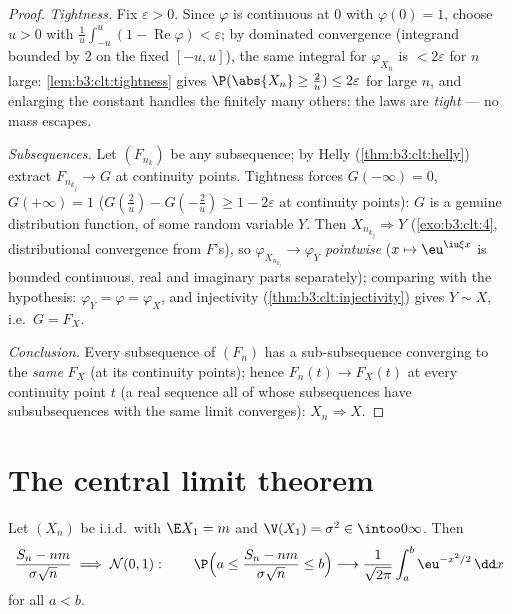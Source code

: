 \begin{proof}
\emph{Tightness.} Fix $\varepsilon > 0$. Since $\varphi$ is
continuous at $0$ with $\varphi(0) = 1$, choose $u > 0$ with
$\frac1u\int_{-u}^u(1 - \operatorname{Re}\varphi) <
\varepsilon$; by dominated convergence (integrand bounded by
$2$ on the fixed $[-u,u]$), the same integral for
$\varphi_{X_n}$ is $< 2\varepsilon$ for $n$ large:
\cref{lem:b3:clt:tightness} gives $\P(\abs{X_n} \geq \frac2u)
\leq 2\varepsilon$ for large $n$, and enlarging the constant
handles the finitely many others: the laws are \emph{tight}
--- no mass escapes.

\emph{Subsequences.} Let $(F_{n_k})$ be any subsequence; by
Helly (\cref{thm:b3:clt:helly}) extract $F_{n_{k_j}} \to G$
at continuity points. Tightness forces $G(-\infty) = 0$,
$G(+\infty) = 1$ ($G(\frac2u) - G(-\frac2u) \geq 1 -
2\varepsilon$ at continuity points): $G$ is a genuine
distribution function, of some random variable $Y$. Then
$X_{n_{k_j}} \Rightarrow Y$ (\cref{exo:b3:clt:4},
distributional convergence from $F$'s), so
$\varphi_{X_{n_{k_j}}} \to \varphi_Y$ \emph{pointwise} ($x
\mapsto \eu^{\iu\xi x}$ is bounded continuous, real and
imaginary parts separately); comparing with the hypothesis:
$\varphi_Y = \varphi = \varphi_X$, and injectivity
(\cref{thm:b3:clt:injectivity}) gives $Y \sim X$, i.e.\ $G =
F_X$.

\emph{Conclusion.} Every subsequence of $(F_n)$ has a
sub-subsequence converging to the \emph{same} $F_X$ (at its
continuity points); hence $F_n(t) \to F_X(t)$ at every
continuity point $t$ (a real sequence all of whose
subsequences have subsubsequences with the same limit
converges): $X_n \Rightarrow X$.
\end{proof}

\section{The central limit theorem}

\begin{theorem}\label{thm:b3:clt:clt}
Let $(X_n)$ be i.i.d.\ with $\E X_1 = m$ and $\V(X_1) =
\sigma^2 \in \intoo0\infty$. Then
\[
\frac{S_n - nm}{\sigma\sqrt n} \;\Longrightarrow\; \mathcal
N(0, 1) :
\qquad
\P\Bigl(a \leq \frac{S_n - nm}{\sigma\sqrt n} \leq
b\Bigr) \longrightarrow
\frac{1}{\sqrt{2\pi}}\int_a^b\eu^{-x^2/2}\,\dd x
\]
for all $a < b$.
\end{theorem}

